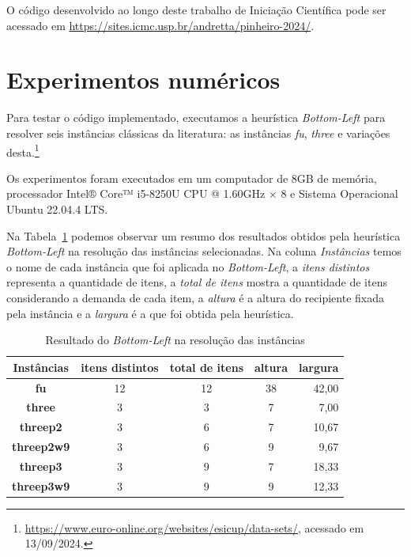 \documentclass{article}
\begin{document}
O código desenvolvido ao longo deste trabalho de Iniciação Científica pode ser acessado em \url{https://sites.icmc.usp.br/andretta/pinheiro-2024/}.

\section{Experimentos numéricos} \label{sec:experimentos}

Para testar o código implementado, executamos a heurística {\it Bottom-Left} para resolver seis instâncias clássicas da literatura: as instâncias {\it fu}, {\it three} e variações desta.\footnote{\url{https://www.euro-online.org/websites/esicup/data-sets/}, acessado em 13/09/2024.} 

Os experimentos foram executados em um computador de 8GB de memória, processador Intel® Core™ i5-8250U CPU @ 1.60GHz × 8 e Sistema Operacional Ubuntu 22.04.4 LTS.  

Na Tabela~\ref{resultado_inst} podemos observar um resumo dos resultados obtidos pela heurística {\it Bottom-Left} na resolução das instâncias selecionadas.  Na coluna {\it Instâncias} temos o nome de cada instância que foi aplicada no {\it Bottom-Left}, a {\it itens distintos} representa a quantidade de itens, a {\it total de itens} mostra a quantidade de itens considerando a demanda de cada item, a {\it altura} é a altura do recipiente fixada pela instância e a {\it largura} é a que foi obtida pela heurística. %

\begin{table}[!htbp]

  \centering
    \small{
      \begin{tabular}{|c|c|c|c|r|}
        \hline
        \multicolumn{ 1}{|c|}{\textbf{Instâncias}}& \multicolumn{1}{c|}{\textbf{itens distintos}} & \multicolumn{1}{c|}{\textbf{total de itens}} & \multicolumn{1}{c|}{\textbf{altura}}&\multicolumn{1}{c|}{\textbf{largura}}\\
        \hline
        \multicolumn{ 1}{|c|}{\textbf{fu}} &    12     &    12    &   38    &   42,00    \\
        \hline 
        \multicolumn{ 1}{|c|}{\textbf{three}} &    3    &    3    &    7    &    7,00    \\
        \hline 
        \multicolumn{ 1}{|c|}{\textbf{threep2}} &    3    &    6    &    7    &    10,67    \\
        \hline
        \multicolumn{ 1}{|c|}{\textbf{threep2w9}} &    3    &    6    &    9    &    9,67    \\
        \hline
        \multicolumn{ 1}{|c|}{\textbf{threep3}} &    3    &    9    &    7    &    18,33    \\
        \hline
        \multicolumn{ 1}{|c|}{\textbf{threep3w9}} &    3    &    9    &    9    &    12,33    \\
        \hline
      \end{tabular}}
  \caption{Resultado do {\it Bottom-Left} na resolução das instâncias}
    \label{resultado_inst}
\end{table}
\end{document}
